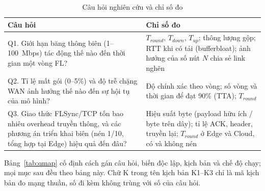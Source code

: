 \begin{table}[H]
    \centering
    \caption{Câu hỏi nghiên cứu và chỉ số đo}
    \label{tab:rq}
    \begin{tabularx}{\textwidth}{>{\raggedright\arraybackslash\hsize=1.1\hsize}X >{\raggedright\arraybackslash\hsize=0.9\hsize}X}
        \toprule
        \textbf{Câu hỏi} & \textbf{Chỉ số đo} \\
        \midrule
        Q1. Giới hạn băng thông biên (1--100~Mbps) tác động thế nào đến thời gian một vòng FL? & $T_{round}$, $T_{down}$, $T_{up}$; thông lượng gộp; RTT khi có tải (bufferbloat); ảnh hưởng của số nút $N$ chia sẻ link nghẽn \\
        \midrule
        Q2. Tỉ lệ mất gói (0--5\%) và độ trễ chặng WAN ảnh hưởng thế nào đến sự hội tụ của mô hình? & Độ chính xác theo vòng; số vòng và thời gian để đạt 90\% (TTA); $T_{round}$ \\
        \midrule
        Q3. Giao thức FLSync/TCP tốn bao nhiêu overhead truyền thông, và các phương án triển khai biên (nén 1/10, tổng hợp tại Edge) hiệu quả đến đâu? & Hiệu suất byte (payload hữu ích / byte trên dây); tỉ lệ ACK, header, truyền lại; $T_{round}$ ở Edge và Cloud, có và không nén \\
        \bottomrule
    \end{tabularx}
\end{table}

Bảng~\ref{tab:qmap} cố định cách gán câu hỏi, biến độc lập, kịch bản và chế độ chạy; mọi mục sau đều theo bảng này. Chữ K trong tên kịch bản K1--K3 chỉ là mã kịch bản đo mạng thuần, số đi kèm không trùng với số của câu hỏi.

